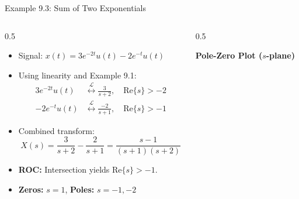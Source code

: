 \begin{frame}{Example 9.3: Sum of Two Exponentials}
    \begin{columns}[T]
        \begin{column}{0.5\textwidth}
            \begin{itemize}
                \item Signal: $x(t) = 3e^{-2t}u(t) - 2e^{-t}u(t)$
                \item Using linearity and Example 9.1:
                      \begin{align*}
                          3e^{-2t}u(t) & \overset{{\mathcal{L}}}{\longleftrightarrow} \frac{3}{s+2}, \quad \text{Re}\{s\} > -2  \\
                          -2e^{-t}u(t) & \overset{{\mathcal{L}}}{\longleftrightarrow} \frac{-2}{s+1}, \quad \text{Re}\{s\} > -1
                      \end{align*}
                \item Combined transform:
                      \begin{equation*}
                          X(s) = \frac{3}{s+2} - \frac{2}{s+1} = \frac{s - 1}{(s+1)(s+2)}
                      \end{equation*}
                \item \textbf{ROC:} Intersection yields $\text{Re}\{s\} > -1$.
                \item \textbf{Zeros:} $s = 1$, \quad \textbf{Poles:} $s = -1, -2$
            \end{itemize}
        \end{column}
        \begin{column}{0.5\textwidth}
            \begin{center}
                \vspace{0.6cm}
                \textbf{Pole-Zero Plot ($s$-plane)}
                \vspace{0.1cm}


\end{center}
\end{column}
\end{columns}
\end{frame}
